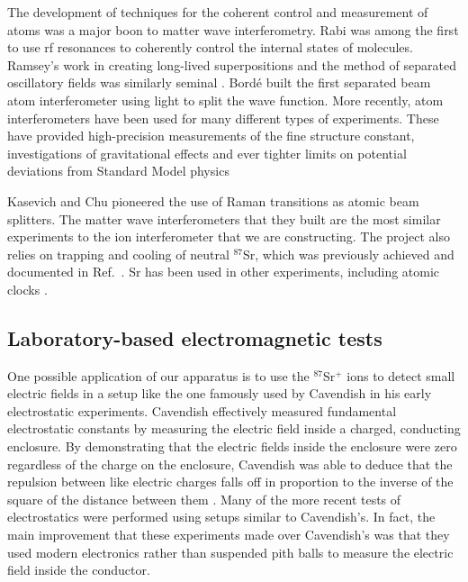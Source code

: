 The development of techniques for the coherent control and measurement of atoms was a major boon to matter wave interferometry\cite{Kronin_RMP}. Rabi was among the first to use rf resonances to coherently control the internal states of molecules\cite{RabiOriginal}\cite{Kronin_RMP}. 
Ramsey's work in creating long-lived superpositions and the method of separated oscillatory fields was similarly seminal \cite{Kronin_RMP}\cite{Ramsey_original}. 
Bord\'e built \cite{borde_interferometer} the first separated beam atom interferometer using light to split the wave function. 
More recently, atom interferometers have been used for many different types of experiments. These have provided high-precision measurements of the fine structure constant\cite{WichtFineStructure,WeissFineStructure,GibbleFineStructure}, investigations of gravitational effects \cite{mullerIsotropyGR,KasevichGravWaves} and ever tighter limits on potential deviations from Standard Model physics\cite{mullerLorentzInvarianceElectrodynamics,Kronin_RMP,KasevichInertial}

Kasevich and Chu pioneered the use of Raman transitions as atomic beam splitters\cite{kasevichChu1991}. The matter wave interferometers that they built are the most similar experiments to the ion interferometer that we are constructing. 
The project also relies on trapping and cooling of neutral $^{87}$Sr, which was previously achieved and documented in Ref.~\cite{kurosu_trap_sr}. Sr has been used in other experiments, including atomic clocks \cite{ludlow_science}.

\subsection{Laboratory-based electromagnetic tests}

One possible application of our apparatus is to use the $^{87}$Sr$^+$ ions to detect small electric fields in a setup like the one famously used by Cavendish in his early electrostatic experiments. Cavendish effectively measured fundamental electrostatic constants by measuring the electric field inside a charged, conducting enclosure. By demonstrating that the electric fields inside the enclosure were zero regardless of the charge on the enclosure, Cavendish was able to deduce that the repulsion between like electric charges falls off in proportion to the inverse of the square of the distance between them \cite{geodude}. Many of the more recent tests of electrostatics were performed using setups similar to Cavendish's\cite{jackson}.  In fact, the main improvement that these experiments made over Cavendish's was that they used modern electronics rather than suspended pith balls to measure the electric field inside the conductor.


